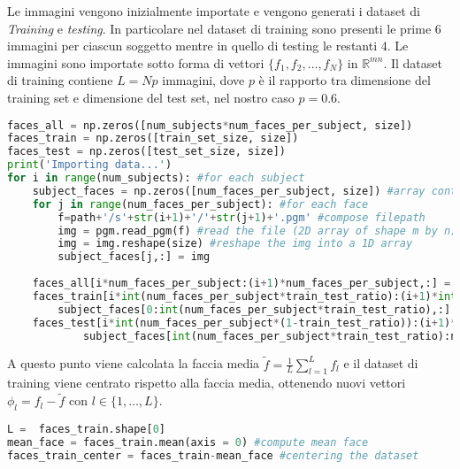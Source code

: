 Le immagini vengono inizialmente importate e vengono generati i dataset di \textit{Training} e \textit{testing}. In particolare nel dataset di training sono presenti le prime 6 immagini per ciascun soggetto mentre in quello di testing le restanti 4. Le immagini sono importate sotto forma di vettori \(\{f_1, f_2, \dots, f_N\}\) in \(\mathbb{R}^{mn}\). Il dataset di training contiene \(L = Np\) immagini, dove \(p\) è il rapporto tra dimensione del training set e dimensione del test set, nel nostro caso \(p = 0.6\).

\begin{lstlisting}[language=Python, caption= Data import]
faces_all = np.zeros([num_subjects*num_faces_per_subject, size])
faces_train = np.zeros([train_set_size, size])
faces_test = np.zeros([test_set_size, size])
print('Importing data...')
for i in range(num_subjects): #for each subject
    subject_faces = np.zeros([num_faces_per_subject, size]) #array containing all faces of the subject
    for j in range(num_faces_per_subject): #for each face
        f=path+'/s'+str(i+1)+'/'+str(j+1)+'.pgm' #compose filepath
        img = pgm.read_pgm(f) #read the file (2D array of shape m by n)
        img = img.reshape(size) #reshape the img into a 1D array
        subject_faces[j,:] = img 
    
    faces_all[i*num_faces_per_subject:(i+1)*num_faces_per_subject,:] = subject_faces
    faces_train[i*int(num_faces_per_subject*train_test_ratio):(i+1)*int(num_faces_per_subject*train_test_ratio),:] = \
        subject_faces[0:int(num_faces_per_subject*train_test_ratio),:]
    faces_test[i*int(num_faces_per_subject*(1-train_test_ratio)):(i+1)*int(num_faces_per_subject*(1-train_test_ratio)),:] = \
            subject_faces[int(num_faces_per_subject*train_test_ratio):num_faces_per_subject,:]
\end{lstlisting}

\noindent A questo punto viene calcolata la faccia media \(\tilde{f} = \frac{1}{L}  \sum \limits_{l=1}^{L} f_l\) e il dataset di training viene centrato rispetto alla faccia media, ottenendo nuovi vettori \(\phi_l = f_l - \tilde{f}\) con \(l \in \{1, \dots, L\}\).

\begin{lstlisting}[language=Python, caption= Centering data]
L =  faces_train.shape[0]
mean_face = faces_train.mean(axis = 0) #compute mean face
faces_train_center = faces_train-mean_face #centering the dataset
\end{lstlisting}

